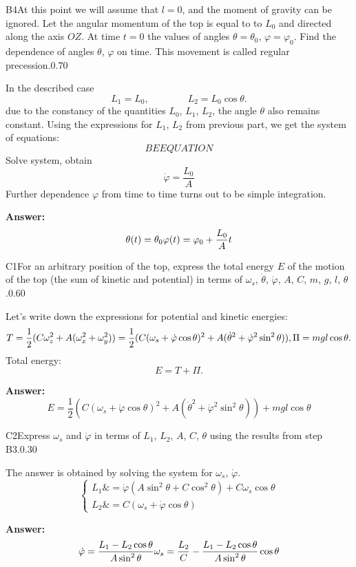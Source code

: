 \documentclass[11pt,a4paper]{article}
\begin{document}
\begin{solcard}{B4}{At this point we will assume that $l = 0$, and the moment of gravity can be ignored. Let the angular momentum of the top is equal to to $L_0$ and directed along the axis $OZ$. At time $t = 0$ the values of angles $\theta = \theta_0$, $\varphi  = \varphi_0$. Find the dependence of angles $\theta$, $\varphi$ on time. This movement is called regular precession.}{0.70}

In the described case $$L_1 = L_0, \qquad \qquad L_2 = L_0 \cos\theta.$$ due to the constancy of the quantities $L_0$, $L_1$, $L_2$, the angle $\theta$ also remains constant. Using the expressions for $L_1$, $L_2$ from previous part, we get the system of equations: $$ BEEQUATION $$Solve system, obtain $$\dot\varphi = \frac{L_0}{A}$$Further dependence $\varphi$ from time to time turns out to be simple integration.

\par\smallskip\noindent\textbf{Answer:} $$ \theta(t) = \theta_0 \\ \varphi(t) = \varphi_0 + \frac{L_0}{A}t $$
\end{solcard}

\begin{solcard}{C1}{For an arbitrary position of the top, express the total energy $E$ of the motion of the top (the sum of kinetic and potential) in terms of $\omega_s$, $\dot{\theta}$, $\dot{\varphi}$, $A$, $C$, $m$, $g$, $l$, $\theta$.}{0.60}

Let's write down the expressions for potential and kinetic energies: $$T = \frac{1}{2} (C\omega_z^2 + A(\omega_x^2 + \omega_y^2) ) = \frac{1}{2} (C(\omega_s + \dot\varphi \cos\theta)^2 + A(\dot\theta^2 + \dot\varphi^2 \sin^2 \theta)), \\ \Pi = mgl \cos\theta.$$Total energy: $$ E = T + \Pi. $$

\par\smallskip\noindent\textbf{Answer:} $$ E = \frac{1}{2} (C(\omega_s + \dot\varphi \cos\theta)^2 + A(\dot\theta^2 + \dot\varphi^2 \sin^2 \theta)) + mgl \cos\theta $$
\end{solcard}

\begin{solcard}{C2}{Express $\omega_s$ and $\dot{\varphi}$ in terms of $L_1$, $L_2$, $A$, $C$, $ \theta$ using the results from step B3.}{0.30}

The answer is obtained by solving the system for $\omega_s$, $\dot\varphi$. \begin{equation} \left\{ \begin{aligned} L_1 \&= \dot{\varphi}(A\sin^2{\theta} + C\cos^2{\theta}) + C\omega_s\cos{\theta} \\ L_2 \&= C(\omega_s + \dot{\varphi}\cos{\theta}) \end{aligned} \right. \end{equation}

\par\smallskip\noindent\textbf{Answer:} $$ \dot{\varphi} = \frac{L_1 - L_2\cos{\theta}}{A\sin^2{\theta}}\\ \ \\ \omega_s = \frac{L_2}{C} - \frac{L_1 - L_2\cos{\theta}}{A\sin^2{\theta}}\cos{\theta} $$
\end{solcard}
\end{document}
